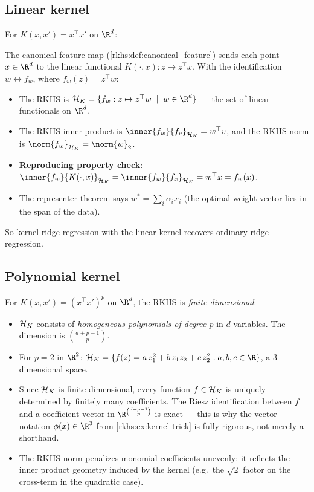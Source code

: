 \begin{notechapter}
\subsection{Linear kernel}

For $K(x,x') = x^\top x'$ on $\R^d$:

The canonical feature map
(\cref{rkhs:def:canonical_feature}) sends each
point $x \in \R^d$ to the linear functional
$K(\cdot, x): z \mapsto z^\top x$. With the
identification $w \leftrightarrow f_w$, where
$f_w(z) = z^\top w$:
\begin{itemize}
  \item The RKHS is
    $\hk = \{f_w : z \mapsto z^\top w \;\mid\;
    w \in \R^d\}$ --- the set of linear functionals
    on $\R^d$.
  \item The RKHS inner product is
    $\inner{f_w}{f_v}_{\hk} = w^\top v$, and the
    RKHS norm is $\norm{f_w}_{\hk} = \norm{w}_2$.
  \item \textbf{Reproducing property check}:
    $\inner{f_w}{K(\cdot,x)}_{\hk}
    = \inner{f_w}{f_x}_{\hk} = w^\top x
    = f_w(x)$.
  \item The representer theorem says
    $w^* = \sum_i \alpha_i x_i$ (the optimal weight
    vector lies in the span of the data).
\end{itemize}

So kernel ridge regression with the linear kernel recovers ordinary
ridge regression.

\subsection{Polynomial kernel}

For $K(x,x') = (x^\top x')^p$ on $\R^d$, the RKHS is
\emph{finite-dimensional}:
\begin{itemize}
  \item $\mathcal{H}_K$ consists of \emph{homogeneous polynomials
    of degree $p$} in $d$ variables. The dimension is
    $\binom{d+p-1}{p}$.
  \item For $p = 2$ in $\R^2$:
    $\hk = \{f(z) = a\,z_1^2 + b\,z_1 z_2 + c\,z_2^2
    : a,b,c \in \R\}$, a $3$-dimensional space.
  \item Since $\mathcal{H}_K$ is finite-dimensional, every function
    $f \in \mathcal{H}_K$ is uniquely determined by finitely many
    coefficients. The Riesz identification between $f$
    and a coefficient vector in $\R^{\binom{d+p-1}{p}}$
    is exact --- this is why the vector notation
    $\phi(x) \in \R^3$ from \cref{rkhs:ex:kernel-trick} is fully rigorous,
    not merely a shorthand.
  \item The RKHS norm penalizes monomial coefficients
    unevenly: it reflects the inner product geometry
    induced by the kernel (e.g.\ the $\sqrt{2}$ factor
    on the cross-term in the quadratic case).
\end{itemize}


\end{notechapter}
